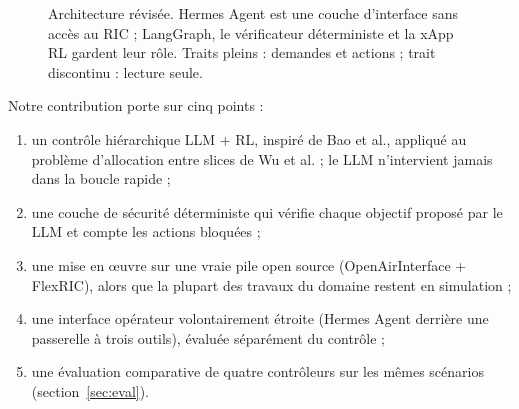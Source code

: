 \documentclass[11pt,a4paper]{article}
\newcommand{\tool}[1]{\texttt{#1}}
\begin{document}
\begin{figure}[H]
\caption{Architecture révisée. Hermes Agent est une couche d'interface sans accès au RIC ;
LangGraph, le vérificateur déterministe et la xApp RL gardent leur rôle. Traits pleins :
demandes et actions ; trait discontinu : lecture seule.}
\label{fig:archi}
\end{figure}

Notre contribution porte sur cinq points :
\begin{enumerate}
  \item un contrôle hiérarchique LLM + RL, inspiré de Bao et al., appliqué au problème
        d'allocation entre slices de Wu et al. ; le LLM n'intervient jamais dans la boucle rapide ;
  \item une couche de sécurité déterministe qui vérifie chaque objectif proposé par le LLM
        et compte les actions bloquées ;
  \item une mise en \oe uvre sur une vraie pile open source (OpenAirInterface + FlexRIC),
        alors que la plupart des travaux du domaine restent en simulation ;
  \item une interface opérateur volontairement étroite (Hermes Agent derrière une passerelle
        à trois outils), évaluée séparément du contrôle ;
  \item une évaluation comparative de quatre contrôleurs sur les mêmes scénarios (section~\ref{sec:eval}).
\end{enumerate}
\end{document}
